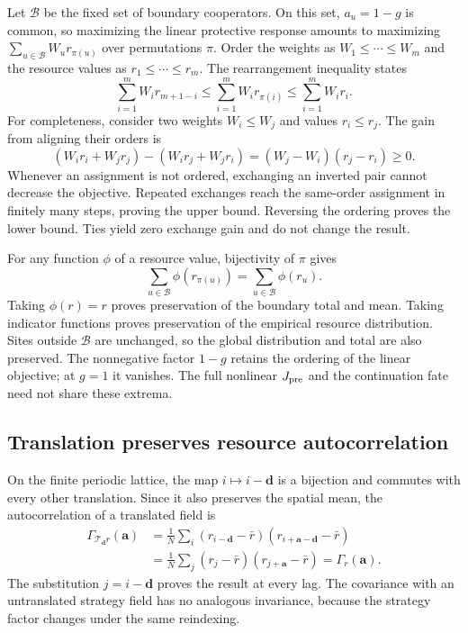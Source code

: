 Let $\mathcal B$ be the fixed set of boundary cooperators. On this set, $a_u=1-g$ is common, so maximizing the linear protective response amounts to maximizing $\sum_{u\in\mathcal B}W_u r_{\pi(u)}$ over permutations $\pi$. Order the weights as $W_1\le\cdots\le W_m$ and the resource values as $r_1\le\cdots\le r_m$. The rearrangement inequality states
\begin{equation}
\label{eq:rearrangement}
\sum_{i=1}^m W_i r_{m+1-i}
\le \sum_{i=1}^m W_i r_{\pi(i)}
\le \sum_{i=1}^m W_i r_i.
\end{equation}
For completeness, consider two weights $W_i\le W_j$ and values $r_i\le r_j$. The gain from aligning their orders is
\begin{equation}
\label{eq:exchange}
(W_i r_i+W_j r_j)-(W_i r_j+W_j r_i)
=(W_j-W_i)(r_j-r_i)\ge0.
\end{equation}
Whenever an assignment is not ordered, exchanging an inverted pair cannot decrease the objective. Repeated exchanges reach the same-order assignment in finitely many steps, proving the upper bound. Reversing the ordering proves the lower bound. Ties yield zero exchange gain and do not change the result.

For any function $\phi$ of a resource value, bijectivity of $\pi$ gives
\begin{equation}
\label{eq:permutation}
\sum_{u\in\mathcal B}\phi(r_{\pi(u)})
=\sum_{u\in\mathcal B}\phi(r_u).
\end{equation}
Taking $\phi(r)=r$ proves preservation of the boundary total and mean. Taking indicator functions proves preservation of the empirical resource distribution. Sites outside $\mathcal B$ are unchanged, so the global distribution and total are also preserved. The nonnegative factor $1-g$ retains the ordering of the linear objective; at $g=1$ it vanishes. The full nonlinear $J_{\rm pre}$ and the continuation fate need not share these extrema.

\subsection{Translation preserves resource autocorrelation}

On the finite periodic lattice, the map $i\mapsto i-\mathbf d$ is a bijection and commutes with every other translation. Since it also preserves the spatial mean, the autocorrelation of a translated field is
\begin{equation}
\label{eq:translation_autocorrelation_proof}
\begin{aligned}
\Gamma_{\mathcal T_{\mathbf d}r}(\mathbf a)
&=\frac1N\sum_i(r_{i-\mathbf d}-\bar r)
                  (r_{i+\mathbf a-\mathbf d}-\bar r)\\
&=\frac1N\sum_j(r_j-\bar r)(r_{j+\mathbf a}-\bar r)
=\Gamma_r(\mathbf a).
\end{aligned}
\end{equation}
The substitution $j=i-\mathbf d$ proves the result at every lag. The covariance with an untranslated strategy field has no analogous invariance, because the strategy factor changes under the same reindexing.

